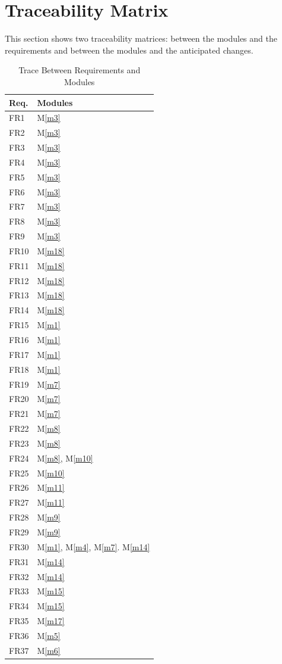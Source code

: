 \documentclass[12pt, titlepage]{article}
\newcommand{\mref}[1]{M\ref{#1}}
\begin{document}
\section{Traceability Matrix} \label{SecTM}

This section shows two traceability matrices: between the modules and the
requirements and between the modules and the anticipated changes.

\begin{table}[H]
	\centering
	\begin{tabular}{p{} p{}}
		\toprule
		\textbf{Req.} & \textbf{Modules}\\
		\midrule
		FR1 & \mref{m3}\\
		FR2 & \mref{m3}\\
		FR3 & \mref{m3}\\
		FR4 & \mref{m3}\\
		FR5 & \mref{m3}\\
		FR6 & \mref{m3}\\
		FR7 & \mref{m3}\\
		FR8 & \mref{m3}\\
		FR9 & \mref{m3}\\
		FR10 & \mref{m18}\\
		FR11 & \mref{m18}\\
		FR12 & \mref{m18}\\
		FR13 & \mref{m18}\\
		FR14 & \mref{m18}\\
		FR15 & \mref{m1}\\
		FR16 & \mref{m1}\\
		FR17 & \mref{m1}\\
		FR18 & \mref{m1}\\
		FR19 & \mref{m7}\\
		FR20 & \mref{m7}\\
		FR21 & \mref{m7}\\
		FR22 & \mref{m8}\\
		FR23 & \mref{m8}\\
		FR24 & \mref{m8}, \mref{m10}\\
		FR25 & \mref{m10}\\
		FR26 & \mref{m11}\\
		FR27 & \mref{m11}\\
		FR28 & \mref{m9}\\
		FR29 & \mref{m9}\\
		FR30 & \mref{m1}, \mref{m4}, \mref{m7}. \mref{m14}\\
		FR31 & \mref{m14}\\
		FR32 & \mref{m14}\\
		FR33 & \mref{m15}\\
		FR34 & \mref{m15}\\
		FR35 & \mref{m17}\\
		FR36 & \mref{m5}\\
		FR37 & \mref{m6}\\
		\bottomrule
	\end{tabular}
	\caption{Trace Between Requirements and Modules}
	\label{TblRT}
\end{table}
\end{document}
